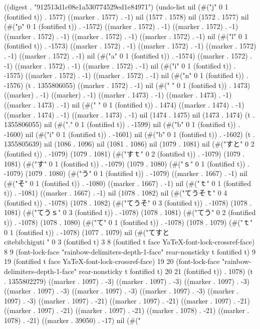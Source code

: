 
((digest . "912513d1c08e1a530774529ed1e84971") (undo-list nil (#("j" 0 1 (fontified t)) . 1577) ((marker . 1577) . -1) nil (1577 . 1578) nil (1572 . 1577) nil (#("p" 0 1 (fontified t)) . -1572) ((marker . 1572) . -1) ((marker . 1572) . -1) ((marker . 1572) . -1) ((marker . 1572) . -1) ((marker . 1572) . -1) nil (#("l" 0 1 (fontified t)) . -1573) ((marker . 1572) . -1) ((marker . 1572) . -1) ((marker . 1572) . -1) ((marker . 1572) . -1) nil (#("a" 0 1 (fontified t)) . -1574) ((marker . 1572) . -1) ((marker . 1572) . -1) ((marker . 1572) . -1) nil (#("i" 0 1 (fontified t)) . -1575) ((marker . 1572) . -1) ((marker . 1572) . -1) nil (#("n" 0 1 (fontified t)) . -1576) (t . 1355806055) ((marker . 1572) . -1) nil (#("
" 0 1 (fontified t)) . 1473) ((marker) . -1) ((marker) . -1) ((marker . 1473) . -1) ((marker . 1473) . -1) ((marker . 1473) . -1) nil (#("
" 0 1 (fontified t)) . 1474) ((marker . 1474) . -1) ((marker . 1474) . -1) ((marker . 1473) . -1) nil (1474 . 1475) nil (1473 . 1474) (t . 1355806055) nil (#("." 0 1 (fontified t)) . -1599) nil (#("b" 0 1 (fontified t)) . -1600) nil (#("i" 0 1 (fontified t)) . -1601) nil (#("b" 0 1 (fontified t)) . -1602) (t . 1355805639) nil (1086 . 1096) nil (1081 . 1086) nil (1079 . 1081) nil (#("すと" 0 2 (fontified t)) . -1079) (1079 . 1081) (#("すｔ" 0 2 (fontified t)) . -1079) (1079 . 1081) (#("す" 0 1 (fontified t)) . -1079) (1079 . 1080) (#("ｓ" 0 1 (fontified t)) . -1079) (1079 . 1080) (#("う" 0 1 (fontified t)) . -1079) ((marker . 1667) . -1) nil (#("そ" 0 1 (fontified t)) . -1080) ((marker . 1667) . -1) nil (#("ｔ" 0 1 (fontified t)) . -1081) ((marker . 1667) . -1) nil (1078 . 1082) nil (#("てうそｔ" 0 4 (fontified t)) . -1078) (1078 . 1082) (#("てうそ" 0 3 (fontified t)) . -1078) (1078 . 1081) (#("てうｓ" 0 3 (fontified t)) . -1078) (1078 . 1081) (#("てう" 0 2 (fontified t)) . -1078) (1078 . 1080) (#("て" 0 1 (fontified t)) . -1078) (1078 . 1079) (#("ｔ" 0 1 (fontified t)) . -1078) (1077 . 1079) nil (#("てすと\\cite{bib:higuti}
" 0 3 (fontified t) 3 8 (fontified t face YaTeX-font-lock-crossref-face) 8 9 (font-lock-face "rainbow-delimiters-depth-1-face" rear-nonsticky t fontified t) 9 19 (fontified t face YaTeX-font-lock-crossref-face) 19 20 (font-lock-face "rainbow-delimiters-depth-1-face" rear-nonsticky t fontified t) 20 21 (fontified t)) . 1078) (t . 1355802279) ((marker . 1097) . -3) ((marker . 1097) . -3) ((marker . 1097) . -3) ((marker . 1097) . -3) ((marker . 1097) . -3) ((marker . 1097) . -3) ((marker . 1097) . -3) ((marker . 1097) . -21) ((marker . 1097) . -21) ((marker . 1097) . -21) ((marker . 1097) . -21) ((marker . 1097) . -21) ((marker . 1078) . -21) ((marker . 1078) . -21) ((marker . 39050) . -17) nil (#("
